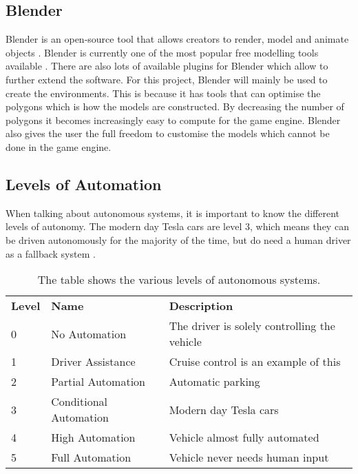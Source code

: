 \subsection{Blender}\label{blender}
Blender is an open-source tool that allows creators to render, model and animate objects \cite{EzraThessMendozaGuevarra2019MaAU}. Blender is currently one of the most popular free modelling tools available \cite{MendozaGuevarraEzraThess2020CGEi}. There are also lots of available plugins for Blender which allow to further extend the software. For this project, Blender will mainly be used to create the environments. This is because it has tools that can optimise the polygons which is how the models are constructed. By decreasing the number of polygons it becomes increasingly easy to compute for the game engine. Blender also gives the user the full freedom to customise the models which cannot be done in the game engine.  

\subsection{Levels of Automation}
When talking about autonomous systems, it is important to know the different levels of autonomy. The modern day Tesla cars are level 3, which means they can be driven autonomously for the majority of the time, but do need a human driver as a fallback system \cite{teslaSelf, Bagloee2016}.
\begin{table}[H]
\begin{tabular}{lll}
\textbf{Level} & \textbf{Name}                   & \textbf{Description} \\
0     & No Automation          & The driver is solely controlling the vehicle\\
1     & Driver Assistance      & Cruise control is an example of this             \\
2     & Partial Automation     & Automatic parking            \\
3     & Conditional Automation & Modern day Tesla cars            \\
4     & High Automation        & Vehicle almost fully automated           \\
5     & Full Automation        & Vehicle never needs human input
\end{tabular}
\caption[Levels of Automation]{The table shows the various levels of autonomous systems.}
\end{table}

